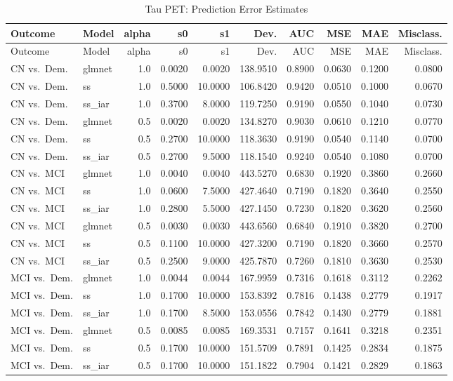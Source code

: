 \documentclass[
]{article}
\begin{document}
\begin{longtable}[]{@{}llrrrrrrrr@{}}
\caption{Tau PET: Prediction Error Estimates}\tabularnewline
\toprule
Outcome & Model & alpha & s0 & s1 & Dev. & AUC & MSE & MAE &
Misclass.\tabularnewline
\midrule
\endfirsthead
\toprule
Outcome & Model & alpha & s0 & s1 & Dev. & AUC & MSE & MAE &
Misclass.\tabularnewline
\midrule
\endhead
CN vs.~Dem. & glmnet & 1.0 & 0.0020 & 0.0020 & 138.9510 & 0.8900 &
0.0630 & 0.1200 & 0.0800\tabularnewline
CN vs.~Dem. & ss & 1.0 & 0.5000 & 10.0000 & 106.8420 & 0.9420 & 0.0510 &
0.1000 & 0.0670\tabularnewline
CN vs.~Dem. & ss\_iar & 1.0 & 0.3700 & 8.0000 & 119.7250 & 0.9190 &
0.0550 & 0.1040 & 0.0730\tabularnewline
CN vs.~Dem. & glmnet & 0.5 & 0.0020 & 0.0020 & 134.8270 & 0.9030 &
0.0610 & 0.1210 & 0.0770\tabularnewline
CN vs.~Dem. & ss & 0.5 & 0.2700 & 10.0000 & 118.3630 & 0.9190 & 0.0540 &
0.1140 & 0.0700\tabularnewline
CN vs.~Dem. & ss\_iar & 0.5 & 0.2700 & 9.5000 & 118.1540 & 0.9240 &
0.0540 & 0.1080 & 0.0700\tabularnewline
CN vs.~MCI & glmnet & 1.0 & 0.0040 & 0.0040 & 443.5270 & 0.6830 & 0.1920
& 0.3860 & 0.2660\tabularnewline
CN vs.~MCI & ss & 1.0 & 0.0600 & 7.5000 & 427.4640 & 0.7190 & 0.1820 &
0.3640 & 0.2550\tabularnewline
CN vs.~MCI & ss\_iar & 1.0 & 0.2800 & 5.5000 & 427.1450 & 0.7230 &
0.1820 & 0.3620 & 0.2560\tabularnewline
CN vs.~MCI & glmnet & 0.5 & 0.0030 & 0.0030 & 443.6560 & 0.6840 & 0.1910
& 0.3820 & 0.2700\tabularnewline
CN vs.~MCI & ss & 0.5 & 0.1100 & 10.0000 & 427.3200 & 0.7190 & 0.1820 &
0.3660 & 0.2570\tabularnewline
CN vs.~MCI & ss\_iar & 0.5 & 0.2500 & 9.0000 & 425.7870 & 0.7260 &
0.1810 & 0.3630 & 0.2530\tabularnewline
MCI vs.~Dem. & glmnet & 1.0 & 0.0044 & 0.0044 & 167.9959 & 0.7316 &
0.1618 & 0.3112 & 0.2262\tabularnewline
MCI vs.~Dem. & ss & 1.0 & 0.1700 & 10.0000 & 153.8392 & 0.7816 & 0.1438
& 0.2779 & 0.1917\tabularnewline
MCI vs.~Dem. & ss\_iar & 1.0 & 0.1700 & 8.5000 & 153.0556 & 0.7842 &
0.1430 & 0.2779 & 0.1881\tabularnewline
MCI vs.~Dem. & glmnet & 0.5 & 0.0085 & 0.0085 & 169.3531 & 0.7157 &
0.1641 & 0.3218 & 0.2351\tabularnewline
MCI vs.~Dem. & ss & 0.5 & 0.1700 & 10.0000 & 151.5709 & 0.7891 & 0.1425
& 0.2834 & 0.1875\tabularnewline
MCI vs.~Dem. & ss\_iar & 0.5 & 0.1700 & 10.0000 & 151.1822 & 0.7904 &
0.1421 & 0.2829 & 0.1863\tabularnewline
\bottomrule
\end{longtable}
\end{document}
